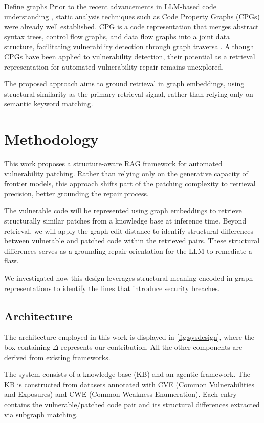 \documentclass[11pt, a4paper]{article}
\begin{document}
Define graphs
Prior to the recent advancements in LLM-based code understanding \cite{llmcodeadvances}, static analysis techniques such as Code Property Graphs (CPGs) \cite{cpgyamaguchi} were already well established. 
CPG is a code representation that merges abstract syntax trees, control flow graphs, and data flow graphs into a joint data structure, facilitating vulnerability detection through graph traversal.
Although CPGs have been applied to vulnerability detection, their potential as a retrieval representation for automated vulnerability repair remains unexplored.

The proposed approach aims to ground retrieval in graph embeddings, using structural similarity as the primary retrieval signal, rather than relying only on semantic keyword matching.

\section*{Methodology}

This work proposes a structure-aware RAG framework for automated vulnerability patching.
Rather than relying only on the generative capacity of frontier models, this approach shifts part of the patching complexity to retrieval precision, better grounding the repair process.

The vulnerable code will be represented using graph embeddings to retrieve structurally similar patches from a knowledge base at inference time.
Beyond retrieval, we will apply the graph edit distance \cite{gao2010survey, li2019simgnn} to identify structural differences between vulnerable and patched code within the retrieved pairs.
These structural differences serves as a grounding repair orientation for the LLM to remediate a flaw. 

We investigated how this design leverages structural meaning encoded in graph representations to identify the lines that introduce security breaches.

\subsection*{Architecture }

The architecture employed in this work is displayed in \figurename{\ref{fig:sysdesign}},
where the box containing $\Delta$ represents our contribution. All the other components are derived from existing frameworks.

The system consists of a knowledge base (KB) and an agentic framework.
The KB is constructed from datasets annotated with CVE (Common Vulnerabilities and Exposures) and CWE (Common Weakness Enumeration). Each entry contains the vulnerable/patched code pair and its structural differences extracted via subgraph matching.
\end{document}
